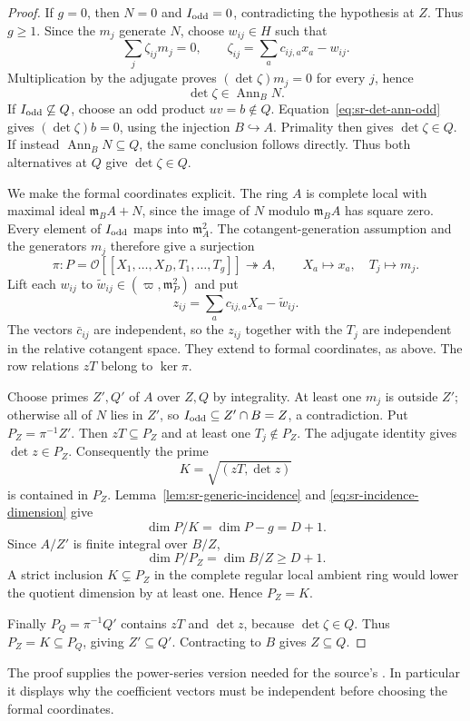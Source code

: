 \begin{proof}
If $g=0$, then $N=0$ and $I_{\rm odd}=0$, contradicting the hypothesis
at $Z$. Thus $g\ge1$.
Since the $m_j$ generate $N$, choose $w_{ij}\in H$ such that
\[
                \sum_j\zeta_{ij}m_j=0,\qquad
          \zeta_{ij}=\sum_a c_{ij,a}x_a-w_{ij}.
\]
Multiplication by the adjugate proves
$(\det\zeta)m_j=0$ for every $j$, hence
\begin{equation}\label{eq:sr-det-ann-odd}
                             \det\zeta\in\operatorname{Ann}_BN.
\end{equation}
If $I_{\rm odd}\not\subseteq Q$, choose an odd product
$uv=b\notin Q$. Equation~\eqref{eq:sr-det-ann-odd} gives
$(\det\zeta)b=0$, using the injection $B\hookrightarrow A$.
Primality then gives $\det\zeta\in Q$.
If instead $\operatorname{Ann}_BN\subseteq Q$, the same conclusion
follows directly. Thus both alternatives at $Q$ give
$\det\zeta\in Q$.

We make the formal coordinates explicit.
The ring $A$ is complete local with maximal ideal
$\mathfrak m_BA+N$, since the image of $N$ modulo $\mathfrak m_BA$
has square zero. Every element of $I_{\rm odd}$ maps into
$\mathfrak m_A^2$.
The cotangent-generation assumption and the generators $m_j$
therefore give a surjection
\[
        \pi:P=\mathcal O[[X_1,\ldots,X_D,T_1,\ldots,T_g]]
                         \twoheadrightarrow A,
          \qquad X_a\mapsto x_a,\quad T_j\mapsto m_j .
\]
Lift each $w_{ij}$ to
$\widetilde w_{ij}\in(\varpi,\mathfrak m_P^2)$ and put
\[
                    z_{ij}=\sum_a c_{ij,a}X_a-\widetilde w_{ij}.
\]
The vectors $\bar c_{ij}$ are independent, so the $z_{ij}$ together
with the $T_j$ are independent in the relative cotangent space.
They extend to formal coordinates, as above.
The row relations $zT$ belong to $\ker\pi$.

Choose primes $Z',Q'$ of $A$ over $Z,Q$ by integrality.
At least one $m_j$ is outside $Z'$; otherwise all of $N$ lies in
$Z'$, so $I_{\rm odd}\subseteq Z'\cap B=Z$, a contradiction.
Put $P_Z=\pi^{-1}Z'$.
Then $zT\subseteq P_Z$ and at least one $T_j\notin P_Z$.
The adjugate identity gives $\det z\in P_Z$.
Consequently the prime
\[
                           K=\sqrt{(zT,\det z)}
\]
is contained in $P_Z$.
Lemma~\ref{lem:sr-generic-incidence} and
\eqref{eq:sr-incidence-dimension} give
\[
                        \dim P/K=\dim P-g=D+1.
\]
Since $A/Z'$ is finite integral over $B/Z$,
\[
                         \dim P/P_Z=\dim B/Z\ge D+1 .
\]
A strict inclusion $K\subsetneq P_Z$ in the complete regular local
ambient ring would lower the quotient dimension by at least one.
Hence $P_Z=K$.

Finally $P_Q=\pi^{-1}Q'$ contains $zT$ and $\det z$, because
$\det\zeta\in Q$. Thus
$P_Z=K\subseteq P_Q$, giving $Z'\subseteq Q'$.
Contracting to $B$ gives $Z\subseteq Q$.
\end{proof}
The proof supplies the power-series version needed for the source's
.
In particular it displays why the coefficient vectors must be
independent before choosing the formal coordinates.

